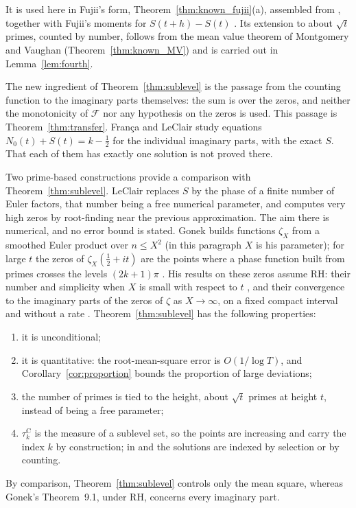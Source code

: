 \documentclass[11pt,a4paper]{article}
\makeatletter
\numberwithin{equation}{section}
\DeclareRobustCommand{\CGref}[1]{\ref{#1}}
\DeclareRobustCommand{\CGcite}[2][]{\if\relax\detokenize{#1}\relax\cite{#2}\else\cite[#1]{#2}\fi}
\let\CG@origref\ref
\newcommand{\CG@gettip}[1]{\@ifundefined{CGTip@#1}{#1}{\csname CGTip@#1\endcsname}}
\newcommand{\CG@getbib}[1]{\@ifundefined{CGBib@#1}{#1}{\csname CGBib@#1\endcsname}}
\DeclareRobustCommand{\CGref}[1]{\pdftooltip{\CG@origref{#1}}{\CG@gettip{#1}}}
\DeclareRobustCommand{\CGcite}[2][]{\pdftooltip{\if\relax\detokenize{#1}\relax\cite{#2}\else\cite[#1]{#2}\fi}{\CG@getbib{#2}}}
\theoremstyle{definition}
\theoremstyle{remark}
\newcommand{\Nz}{N_0} %
\newcommand{\Fc}{\mathcal F}
\makeatother
\begin{document}
It is used here in Fujii's form, Theorem~\CGref{thm:known_fujii}(a), assembled from \CGcite[\S3]{Fujii1974}, together with Fujii's moments for $S(t+h)-S(t)$ \CGcite[Main Theorem]{Fujii1974}. Its extension to about $\sqrt t$ primes, counted by number, follows from the mean value theorem of Montgomery and Vaughan (Theorem~\CGref{thm:known_MV}) and is carried out in Lemma~\CGref{lem:fourth}.

The new ingredient of Theorem~\CGref{thm:sublevel} is the passage from the counting function to the imaginary parts themselves: the sum is over the zeros, and neither the monotonicity of $\Fc$ nor any hypothesis on the zeros is used. This passage is Theorem~\CGref{thm:transfer}. Fran\c{c}a and LeClair \CGcite{FrancaLeClair2015} study equations $\Nz(t)+S(t)=k-\frac12$ for the individual imaginary parts, with the exact $S$. That each of them has exactly one solution is not proved there.

Two prime-based constructions provide a comparison with Theorem~\CGref{thm:sublevel}. LeClair \CGcite[\S VI, eq.~(49)]{LeClair2016} replaces $S$ by the phase of a finite number of Euler factors, that number being a free numerical parameter, and computes very high zeros by root-finding near the previous approximation. The aim there is numerical, and no error bound is stated. Gonek \CGcite{Gonek2012} builds functions $\zeta_X$ from a smoothed Euler product over $n\le X^2$ (in this paragraph $X$ is his parameter); for large $t$ the zeros of $\zeta_X(\frac12+it)$ are the points where a phase function built from primes crosses the levels $(2k+1)\pi$ \CGcite[\S10]{Gonek2012}. His results on these zeros assume RH: their number and simplicity when $X$ is small with respect to $t$ \CGcite[Thm.~8.1]{Gonek2012}, and their convergence to the imaginary parts of the zeros of $\zeta$ as $X\to\infty$, on a fixed compact interval and without a rate \CGcite[Thm.~9.1]{Gonek2012}. Theorem~\CGref{thm:sublevel} has the following properties:
\begin{enumerate}
\item it is unconditional;
\item it is quantitative: the root-mean-square error is $O(1/\log T)$, and Corollary~\CGref{cor:proportion} bounds the proportion of large deviations;
\item the number of primes is tied to the height, about $\sqrt t$ primes at height $t$, instead of being a free parameter;
\item $\tau_{k}^{\mathrm C}$ is the measure of a sublevel set, so the points are increasing and carry the index $k$ by construction; in \CGcite{LeClair2016} and \CGcite{Gonek2012} the solutions are indexed by selection or by counting.
\end{enumerate}
By comparison, Theorem~\CGref{thm:sublevel} controls only the mean square, whereas Gonek's Theorem~9.1, under RH, concerns every imaginary part.
\end{document}
